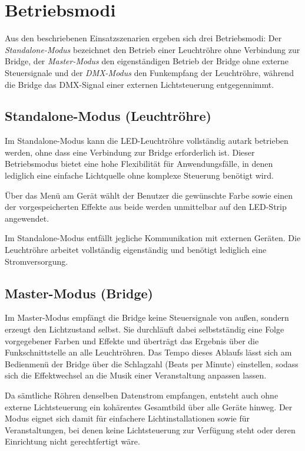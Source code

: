 \section{Betriebsmodi}
\label{sec:betriebsmodi}

Aus den beschriebenen Einsatzszenarien ergeben sich drei Betriebsmodi: Der
\textit{Standalone-Modus} bezeichnet den Betrieb einer Leuchtröhre ohne Verbindung zur
Bridge, der \textit{Master-Modus} den eigenständigen Betrieb der Bridge ohne externe
Steuersignale und der \textit{DMX-Modus} den Funkempfang der Leuchtröhre, während die
Bridge das DMX-Signal einer externen Lichtsteuerung entgegennimmt.

\subsection{Standalone-Modus (Leuchtröhre)}
\label{subsec:standalone-modus}

Im Standalone-Modus kann die LED-Leuchtröhre vollständig
autark betrieben werden, ohne dass eine Verbindung zur Bridge erforderlich ist. 
Dieser Betriebsmodus bietet eine hohe Flexibilität für Anwendungsfälle, 
in denen lediglich eine einfache Lichtquelle ohne komplexe Steuerung benötigt wird.

Über das Menü am Gerät wählt der Benutzer die gewünschte Farbe sowie einen der
vorgespeicherten Effekte aus beide werden unmittelbar auf den LED-Strip angewendet.

Im Standalone-Modus entfällt jegliche Kommunikation mit externen Geräten. Die
Leuchtröhre arbeitet vollständig eigenständig und benötigt lediglich eine
Stromversorgung.

\subsection{Master-Modus (Bridge)}
\label{subsec:master-modus}

Im Master-Modus empfängt die Bridge keine Steuersignale von außen, sondern erzeugt den
Lichtzustand selbst. Sie durchläuft dabei selbstständig eine Folge vorgegebener Farben
und Effekte und überträgt das Ergebnis über die Funkschnittstelle an alle Leuchtröhren.
Das Tempo dieses Ablaufs lässt sich am Bedienmenü der Bridge über die Schlagzahl
(Beats per Minute) einstellen, sodass sich die Effektwechsel an die Musik einer
Veranstaltung anpassen lassen.

Da sämtliche Röhren denselben Datenstrom empfangen, entsteht auch ohne externe
Lichtsteuerung ein kohärentes Gesamtbild über alle Geräte hinweg. Der Modus eignet sich
damit für einfachere Lichtinstallationen sowie für Veranstaltungen, bei denen keine
Lichtsteuerung zur Verfügung steht oder deren Einrichtung nicht gerechtfertigt wäre.

